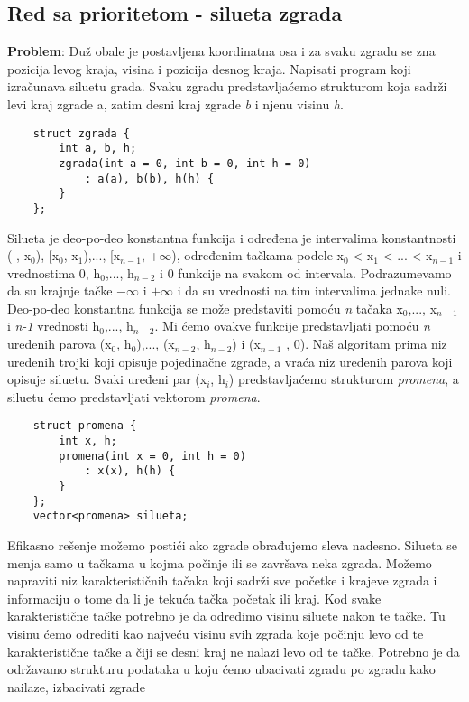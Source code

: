 \documentclass{article}
\begin{document}
\subsection{Red sa prioritetom - silueta zgrada}
\textbf{Problem}: Duž obale je postavljena
koordinatna osa i za svaku zgradu se zna pozicija levog kraja, visina i pozicija
desnog kraja. Napisati program koji izračunava siluetu grada.
Svaku zgradu predstavljaćemo strukturom koja sadrži levi kraj zgrade a, zatim
desni kraj zgrade \textit{b} i njenu visinu \textit{h}.
\begin{lstlisting}
    struct zgrada {
        int a, b, h;
        zgrada(int a = 0, int b = 0, int h = 0)
            : a(a), b(b), h(h) {
        }
    };
\end{lstlisting}
Silueta je deo-po-deo konstantna funkcija i određena je intervalima konstantnosti (-\infty, x$_0$), [x$_0$, x$_1$),..., [x$_{n-1}$, +$\infty$), određenim tačkama podele x$_0$ <
x$_1$ < ... < x$_{n-1}$ i vrednostima 0, h$_0$,..., h$_{n-2}$ i 0 funkcije na svakom od intervala. Podrazumevamo da su krajnje tačke $-\infty$ i $+\infty$ i da su vrednosti na tim intervalima jednake nuli. Deo-po-deo konstantna funkcija se može predstaviti
pomoću \textit{n} tačaka x$_0$,..., x$_{n-1}$ i \textit{n-1} vrednosti h$_0$,..., h$_{n-2}$. Mi ćemo ovakve funkcije predstavljati pomoću \textit{n} uređenih parova (x$_0$, h$_0$),..., (x$_{n-2}$, h$_{n-2}$) i (x$_{n-1}$ , 0). Naš algoritam prima niz uređenih trojki koji opisuje pojedinačne zgrade, a vraća niz uređenih parova koji opisuje
siluetu.
Svaki uređeni par (x$_i$, h$_i$) predstavljaćemo strukturom \textit{promena}, a siluetu ćemo predstavljati vektorom \textit{promena}.
\begin{lstlisting}
    struct promena {
        int x, h;
        promena(int x = 0, int h = 0)
            : x(x), h(h) {
        }
    };
    vector<promena> silueta;
\end{lstlisting}
Efikasno rešenje možemo postići ako zgrade obrađujemo sleva nadesno.
Silueta se menja samo u tačkama u kojma počinje ili se završava neka zgrada. Možemo napraviti niz karakterističnih tačaka koji sadrži sve početke i
krajeve zgrada i informaciju o tome da li je tekuća tačka početak ili kraj. Kod
svake karakteristične tačke potrebno je da odredimo visinu siluete nakon te tačke.
Tu visinu ćemo odrediti kao najveću visinu svih zgrada koje počinju levo od te
karakteristične tačke a čiji se desni kraj ne
nalazi levo od te tačke. Potrebno je da održavamo strukturu podataka u koju ćemo ubacivati zgradu
po zgradu kako nailaze, izbacivati zgrade
\end{document}
